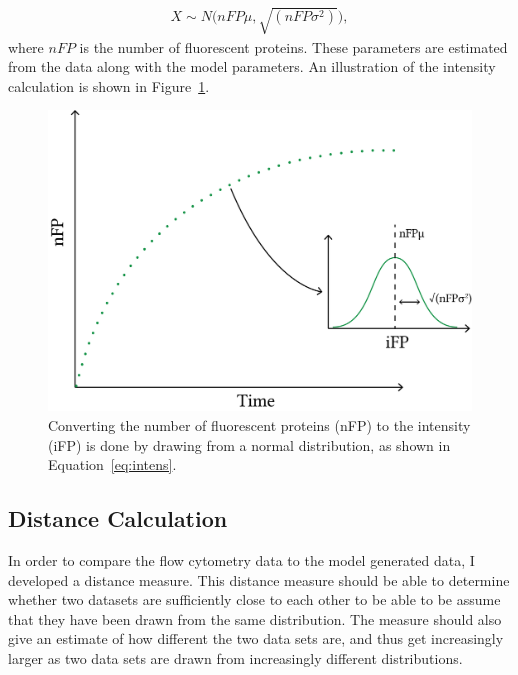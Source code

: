 \begin{align}
	X\sim N\Big(nFP\mu, \sqrt{(nFP\sigma^2)}\Big), \label{eq:intens}
\end{align}
where $nFP$ is the number of fluorescent proteins. These parameters are estimated from the data along with the model parameters. An illustration of the intensity calculation is shown in Figure~\ref{fig:intensity_calc}. 

\begin{figure}[tb]
	\begin{center}
		\includegraphics[scale=0.5]{../../chapters/chapterABCFlow/images/intensity_calc.png}
		\caption[Converting the number of fluorescent proteins to intensity]{\label{fig:intensity_calc}Converting the number of fluorescent proteins (nFP) to the intensity (iFP) is done by drawing from a normal distribution, as shown in Equation~\ref{eq:intens}.}
	\end{center}
\end{figure}
\clearpage
\subsection{Distance Calculation}

In order to compare the flow cytometry data to the model generated data, I developed a distance measure. This distance measure should be able to determine whether two datasets are sufficiently close to each other to be able to be assume that they have been drawn from the same distribution. The measure should also give an estimate of how different the two data sets are, and thus get increasingly larger as two data sets are drawn from increasingly different distributions. %


